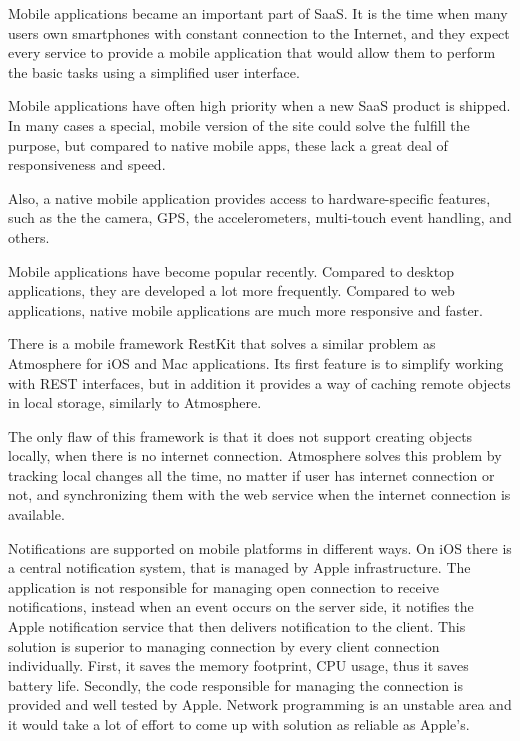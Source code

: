 Mobile applications became an important part of SaaS. It is the time when many users own smartphones with constant connection to the Internet, and they expect every service to provide a mobile application that would allow them to perform the basic tasks using a simplified user interface. \citep{facebook_stats}

Mobile applications have often high priority when a new SaaS product is shipped. In many cases a special, mobile version of the site could solve the fulfill the purpose, but compared to native mobile apps, these lack a great deal of responsiveness and speed.

Also, a native mobile application provides access to hardware-specific features, such as the the camera, GPS, the accelerometers, multi-touch event handling, and others.

Mobile applications have become popular recently. \citep{facebook_stats} Compared to desktop applications, they are developed a lot more frequently. Compared to web applications, native mobile applications are much more responsive and faster.

There is a mobile framework RestKit \citep{restkit} that solves a similar problem as Atmosphere for iOS and Mac applications. Its first feature is to simplify working with REST interfaces, but in addition it provides a way of caching remote objects in local storage, similarly to Atmosphere.

The only flaw of this framework is that it does not support creating objects locally, when there is no internet connection. Atmosphere solves this problem by tracking local changes all the time, no matter if user has internet connection or not, and synchronizing them with the web service when the internet connection is available.

Notifications are supported on mobile platforms in different ways. On iOS there is a central notification system, that is managed by Apple infrastructure. \citep{iphone_ipad_book} The application is not responsible for managing open connection to receive notifications, instead when an event occurs on the server side, it notifies the Apple notification service that then delivers notification to the client. This solution is superior to managing connection by every client connection individually. First, it saves the memory footprint, CPU usage, thus it saves battery life. Secondly, the code responsible for managing the connection is provided and well tested by Apple. Network programming is an unstable area and it would take a lot of effort to come up with solution as reliable as Apple's.


